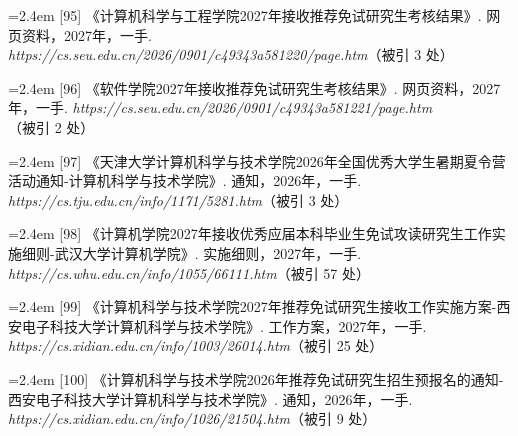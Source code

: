 {\nopagebreak\vspace{1pt}
\noindent\hangindent=2.4em \label{src:S0116}{\color{cAccent}[95]} 《计算机科学与工程学院2027年接收推荐免试研究生考核结果》. 网页资料，2027年，一手. \textit{https://cs.seu.edu.cn/2026/0901/c49343a581220/page.htm}（被引 3 处）\par
\vspace{0.6pt}
\noindent\hangindent=2.4em \label{src:S0117}{\color{cAccent}[96]} 《软件学院2027年接收推荐免试研究生考核结果》. 网页资料，2027年，一手. \textit{https://cs.seu.edu.cn/2026/0901/c49343a581221/page.htm}（被引 2 处）\par
\vspace{0.6pt}
\vspace{3.5pt}\par
\nopagebreak\vspace{1pt}
\noindent\hangindent=2.4em \label{src:S0118}{\color{cAccent}[97]} 《天津大学计算机科学与技术学院2026年全国优秀大学生暑期夏令营活动通知-计算机科学与技术学院》. 通知，2026年，一手. \textit{https://cs.tju.edu.cn/info/1171/5281.htm}（被引 3 处）\par
\vspace{0.6pt}
\vspace{3.5pt}\par
\nopagebreak\vspace{1pt}
\noindent\hangindent=2.4em \label{src:S0119}{\color{cAccent}[98]} 《计算机学院2027年接收优秀应届本科毕业生免试攻读研究生工作实施细则-武汉大学计算机学院》. 实施细则，2027年，一手. \textit{https://cs.whu.edu.cn/info/1055/66111.htm}（被引 57 处）\par
\vspace{0.6pt}
\vspace{3.5pt}\par
\nopagebreak\vspace{1pt}
\noindent\hangindent=2.4em \label{src:S0120}{\color{cAccent}[99]} 《计算机科学与技术学院2027年推荐免试研究生接收工作实施方案-西安电子科技大学计算机科学与技术学院》. 工作方案，2027年，一手. \textit{https://cs.xidian.edu.cn/info/1003/26014.htm}（被引 25 处）\par
\vspace{0.6pt}
\noindent\hangindent=2.4em \label{src:S0121}{\color{cAccent}[100]} 《计算机科学与技术学院2026年推荐免试研究生招生预报名的通知-西安电子科技大学计算机科学与技术学院》. 通知，2026年，一手. \textit{https://cs.xidian.edu.cn/info/1026/21504.htm}（被引 9 处）\par
}
